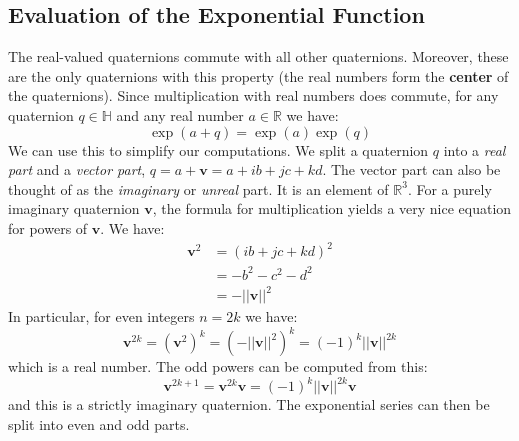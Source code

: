 \documentclass{article}
\begin{document}
        \subsection{Evaluation of the Exponential Function}
            The real-valued quaternions commute with all other quaternions.
            Moreover, these are the only quaternions with this property
            (the real numbers form the \textbf{center} of the quaternions).
            Since multiplication with real numbers does commute, for any
            quaternion $q\in\mathbb{H}$ and any real number
            $a\in\mathbb{R}$ we have:
            \begin{equation}
                \exp(a+q)=\exp(a)\exp(q)
            \end{equation}
            We can use this to simplify our computations. We split a
            quaternion $q$ into a \textit{real part} and a \textit{vector part},
            $q=a+\mathbf{v}=a+ib+jc+kd$. The vector part can also be thought of
            as the \textit{imaginary} or \textit{unreal} part. It is an element
            of $\mathbb{R}^{3}$. For a purely imaginary quaternion
            $\mathbf{v}$, the formula for multiplication yields a very nice
            equation for powers of $\mathbf{v}$. We have:
            \begin{subequations}
                \begin{align}
                    \mathbf{v}^{2}
                    &=(ib+jc+kd)^{2}\\
                    &=-b^{2}-c^{2}-d^{2}\\
                    &=-||\mathbf{v}||^{2}
                \end{align}
            \end{subequations}
            In particular, for even integers $n=2k$ we have:
            \begin{equation}
                \mathbf{v}^{2k}
                =(\mathbf{v}^{2})^{k}
                =(-||\mathbf{v}||^{2})^{k}
                =(-1)^{k}||\mathbf{v}||^{2k}
            \end{equation}
            which is a real number. The odd powers can be computed from this:
            \begin{equation}
                \mathbf{v}^{2k+1}
                =\mathbf{v}^{2k}\mathbf{v}
                =(-1)^{k}||\mathbf{v}||^{2k}\mathbf{v}
            \end{equation}
            and this is a strictly imaginary quaternion.
            The exponential series can then be split into even and odd parts.
\end{document}
